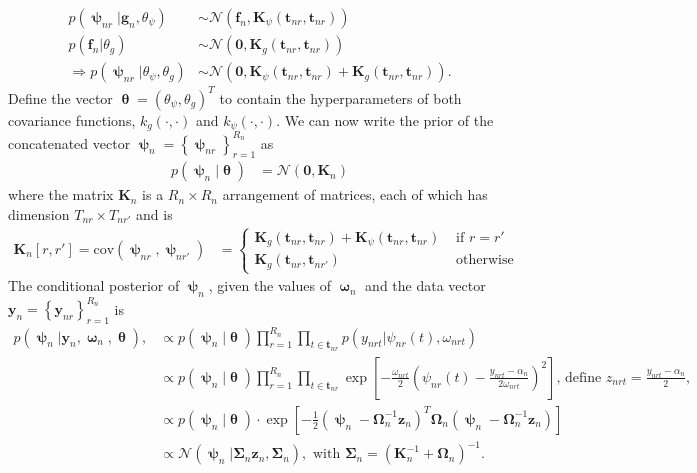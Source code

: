 \documentclass{article}
\newcommand{\pN}{\mathcal{N}}
\newcommand{\1}{\mathbf{1}}
\newcommand{\0}{\mathbf{0}}
\newcommand{\f}{\mathbf{f}}
\newcommand{\K}{\mathbf{K}}
\newcommand{\g}{\mathbf{g}}
\newcommand{\y}{\mathbf{y}}
\begin{document}
\begin{align*}
	p(\bm{\uppsi}_{nr} | \g_{n}, \theta_{\psi}) &\sim \pN \left( \f_n, \K_{\psi}(\mathbf{t}_{nr}, \mathbf{t}_{nr}) \right) \\
	p(\f_n | \theta_{g})  &\sim \pN \left( \mathbf{0}, \K_g(\mathbf{t}_{nr}, \mathbf{t}_{nr}) \right) \\
	\Rightarrow p(\bm{\uppsi}_{nr} | \theta_{\psi}, \theta_g) &\sim \pN\left( \mathbf{0}, \K_{\psi}(\mathbf{t}_{nr}, \mathbf{t}_{nr}) + \K_{g}(\mathbf{t}_{nr}, \mathbf{t}_{nr}) \right).
\end{align*}
%
%
%
Define the vector $\bm{\uptheta} = (\theta_\psi, \theta_g)^T$ to contain the hyperparameters of both covariance functions, $k_g(\cdot, \cdot)$ and $k_\psi(\cdot, \cdot)$. We can now write the prior of the concatenated vector $\bm{\uppsi}_n = \left\{ \bm{\uppsi}_{nr}  \right\}_{r=1}^{R_{n}}$ as 
%
%
\begin{align*}
	p(\bm{\uppsi}_n | \bm{\uptheta}) &= \pN(\mathbf{0}, \K_n)
\end{align*}
%
%
where the matrix $\K_n$ is a $R_n \times R_n$ arrangement of matrices, each of which has dimension $T_{nr} \times T_{nr'}$ and is 
%
%
\begin{align*}
	\K_n[r, r'] = \text{cov}(\bm{\uppsi}_{nr}, \bm{\uppsi}_{nr'}) &= \begin{cases}
		\K_g(\mathbf{t}_{nr}, \mathbf{t}_{nr}) + \K_\psi(\mathbf{t}_{nr}, \mathbf{t}_{nr}) & \text{ if } r=r' \\
		\K_g(\mathbf{t}_{nr}, \mathbf{t}_{nr'}) & \text{ otherwise}
	\end{cases}
\end{align*} 
%
%
The conditional posterior of $\bm{\uppsi}_{n}$, given the values of $\bm{\upomega}_{n}$ and the data vector $\y_{n} = \left\{ \y_{nr} \right\}_{r=1}^{R_{n}}$ is 
%
%
\begin{align*}
	p(\bm{\uppsi}_{n} | \y_{n}, \bm{\upomega}_{n}, \bm{\uptheta}),  &\propto p(\bm{\uppsi}_n | \bm{\uptheta}) \prod_{r=1}^{R_n} \prod_{t\in\mathbf{t}_{nr}} p(y_{nrt} | \psi_{nr}(t), \omega_{nrt}) \\%
	 &\propto p(\bm{\uppsi}_n | \bm{\uptheta}) \prod_{r=1}^{R_n} \prod_{t\in\mathbf{t}_{nr}} \exp\left[ -\frac{\omega_{nrt}}{2}\left( \psi_{nr}(t) - \frac{y_{nrt} - \alpha_{n}}{2 \omega_{nrt}} \right)^2 \right] \text{, define } z_{nrt} = \frac{y_{nrt} - \alpha_{n}}{2 }, \\
	&\propto p(\bm{\uppsi}_{n} | \bm{\uptheta}) \cdot \exp \left[ -\frac{1}{2} \left( \bm{\uppsi}_{n} - \bm{\Omega}^{-1}_{n} \mathbf{z}_n \right)^T \bm{\Omega}_{n} \left( \bm{\uppsi}_{n} - \bm{\Omega}_{n}^{-1} \mathbf{z}_n \right) \right] \\
	&\propto \pN \left(\bm{\uppsi}_{n} | \bm{\Sigma}_{n} \mathbf{z}_n, \bm{\Sigma}_{n}  \right), \text{ with } \bm{\Sigma}_{n} = \left( \K_n^{-1} + \bm{\Omega}_{n} \right)^{-1}.
\end{align*}
\end{document}
